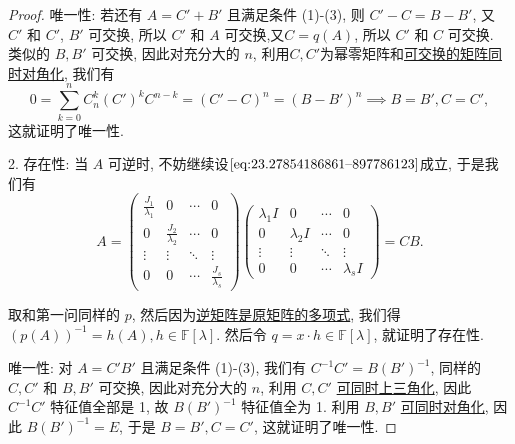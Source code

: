 \documentclass[../../main.tex]{subfiles}
\begin{document}
\begin{proof}
{\heiti 唯一性:} 若还有 \( A = C' + B' \) 且满足条件 (1)-(3), 则 \( C' - C = B - B' \), 又 \( C' \) 和 \( C' \), \( B' \) 可交换, 所以 \( C' \) 和 \( A \) 可交换,又$C=q(A)$, 所以 \( C' \) 和 \( C \) 可交换. 类似的 \( B, B' \) 可交换, 因此对充分大的 \( n \), 利用$C,C'$为幂零矩阵和\hyperref[proposition:一族两两可交换的可对角化矩阵可同时相似对角化]{可交换的矩阵同时对角化}, 我们有
\[
0 = \sum_{k=0}^{n} C_n^k (C')^k C^{n - k} = (C' - C)^n = (B - B')^n \implies B = B', C = C',
\]
这就证明了唯一性.

2. {\heiti 存在性:} 当 \( A \) 可逆时, 不妨继续设\(\eqref{eq:23.27854186861--897786123}\)成立, 于是我们有
\[
A = \begin{pmatrix}
\frac{J_1}{\lambda_1} & 0 & \cdots & 0 \\
0 & \frac{J_2}{\lambda_2} & \cdots & 0 \\
\vdots & \vdots & \ddots & \vdots \\
0 & 0 & \cdots & \frac{J_s}{\lambda_s}
\end{pmatrix} \begin{pmatrix}
\lambda_1 I & 0 & \cdots & 0 \\
0 & \lambda_2 I & \cdots & 0 \\
\vdots & \vdots & \ddots & \vdots \\
0 & 0 & \cdots & \lambda_s I
\end{pmatrix} = CB.
\]

取和第一问同样的 \( p \), 然后因为\hyperref[proposition:矩阵的逆可以用其多项式表示]{逆矩阵是原矩阵的多项式}, 我们得 \( (p(A))^{-1} = h(A), h \in \mathbb{F}[\lambda] \). 然后令 \( q = x \cdot h \in \mathbb{F}[\lambda] \), 就证明了存在性.

{\heiti 唯一性:} 对 \( A = C'B' \) 且满足条件 (1)-(3), 我们有 \( C^{-1}C' = B(B')^{-1} \), 同样的 \( C, C' \) 和 \( B, B' \) 可交换, 因此对充分大的 \( n \), 利用 \( C, C' \) \hyperref[proposition:一族两两可交换的一般域上的矩阵可同时上三角化]{可同时上三角化}, 因此 \( C^{-1}C' \) 特征值全部是 1, 故 \( B(B')^{-1} \) 特征值全为 1. 利用 \( B, B' \) \hyperref[proposition:一族两两可交换的可对角化矩阵可同时相似对角化]{可同时对角化}, 因此 \( B(B')^{-1} = E \), 于是 \( B = B', C = C' \), 这就证明了唯一性.
\end{proof}
\end{document}
